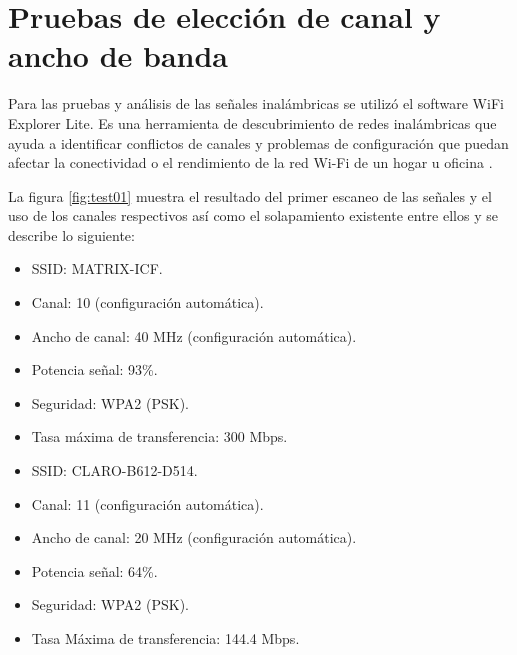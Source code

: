 
\section{Pruebas de elección de canal y ancho de banda}
Para las pruebas y análisis de las señales inalámbricas se utilizó el software WiFi Explorer Lite. Es una herramienta de descubrimiento de redes inalámbricas que ayuda a identificar conflictos de canales y problemas de configuración que puedan afectar la conectividad o el rendimiento de la red Wi-Fi de un hogar u oficina \citep{WEBSITE:24}. 


La figura \ref{fig:test01} muestra el resultado del primer escaneo de las señales y el uso de los canales respectivos así como el solapamiento existente entre ellos y se describe lo siguiente:

\begin{itemize}
\item SSID: MATRIX-ICF.
\item Canal: 10 (configuración automática).
\item Ancho de canal: 40 MHz (configuración automática).
\item Potencia señal: 93\%.
\item Seguridad:  WPA2 (PSK).
\item Tasa máxima de transferencia: 300 Mbps.
\end{itemize}


\begin{itemize} 
\item SSID: CLARO-B612-D514.
\item Canal: 11 (configuración automática).
\item Ancho de canal: 20 MHz (configuración automática).
\item Potencia señal: 64\%.
\item Seguridad: WPA2 (PSK).
\item Tasa Máxima de transferencia: 144.4 Mbps.
\end{itemize}


